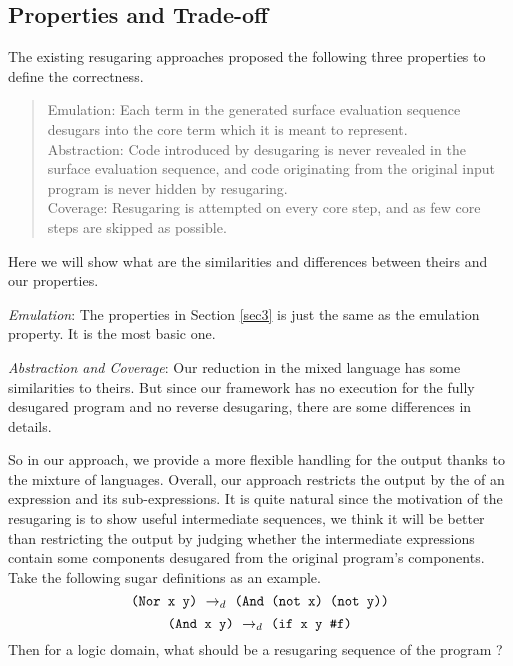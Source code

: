 \subsection{Properties and Trade-off}
\label{mark:correctness}

The existing resugaring approaches \cite{resugaring,hygienic} proposed the following three properties to define the correctness.

\begin{quote}
Emulation:
Each term in the generated surface evaluation sequence desugars into the core term which it is meant to represent.\\
Abstraction:
Code introduced by desugaring is never revealed in the surface evaluation sequence, and code originating from the original input program is never hidden by resugaring.\\
Coverage: Resugaring is attempted on every core step, and as few core steps are skipped as possible.\\
\end{quote}
Here we will show what are the similarities and differences between theirs and our properties.

\emph{Emulation}: The properties in Section \ref{sec3} is just the same as the emulation property. It is the most basic one.

\emph{Abstraction and Coverage}: Our reduction in the mixed language has some similarities to theirs. But since our framework has no execution for the fully desugared program and no reverse desugaring, there are some differences in details. 

So in our approach, we provide a more flexible handling for the output thanks to the mixture of languages. Overall, our approach restricts the output by the  of an expression and its sub-expressions. It is quite natural since the motivation of the resugaring is to show useful intermediate sequences, we think it will be better than restricting the output by judging whether the intermediate expressions contain some components desugared from the original program's components. Take the following sugar definitions as an example.
\[
\texttt{(Nor~x~y)} ~\rightarrow_d~ \texttt{(And~(not~x)~(not~y))}
\]
\[
\texttt{(And~x~y)} ~\rightarrow_d~ \texttt{(if~x~y~\#f)}
\]
Then for a logic domain, what should be a resugaring sequence of the program  ?

